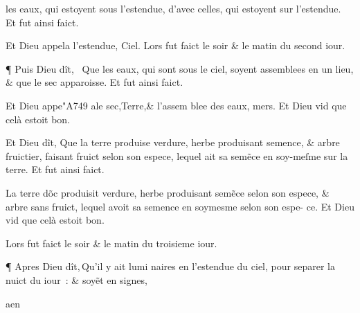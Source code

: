 \documentclass[twocolumn,paper=a4,pagesize=pdftex,12pt,headinclude=on]{scrbook}
\newcounter{verse}
\newcommand{\bverse}{%
  \addtocounter{verse}{1}
  \theverse\quad
}
\let\lb\linebreak
\begin{document}
 \noindent les eaux, qui estoyent sous
 l'estendue, d'avec celles, qui estoyent sur l'esten\-due. Et fut ainsi faict.

\bverse Et Dieu appela l'estendue, Ciel.
 Lors fut faict le soir \& le matin du second iour.

\bverse ¶ Puis Dieu dît, 
 \footnotemarkverse{}~\footnotemarkmain{}Que les eaux,
 qui sont sous le ciel,
 soyent assemblees en un lieu, \& que le sec apparoisse. Et fut ainsi faict.

\bverse Et Dieu appe\char"A749 ale sec,Terre,\& l'assem \lb
 blee des eaux, mers.
 Et Dieu vid que celà estoit bon.

\bverse Et Dieu dît, Que la terre produise verdure, herbe produisant semence,
 \& arbre fruictier, faisant fruict selon son espece, lequel ait sa sem\~ece
 en soy-meſ\-me sur la terre. Et fut ainsi faict.

\bverse La terre d\~oc produisit verdure, her\-be produisant sem\~ece
 selon son espece, \& arbre sans fruict, lequel avoit sa \lb
  semence en soymesme selon son espe- \lb
 ce. Et Dieu vid que celà estoit bon.

\bverse Lors fut faict le soir \& le matin du troisieme iour.

\addtocounter{footnotemain}{1}

\bverse ¶ Apres Dieu dît,\footnotemarkverse{}\,\footnotemarkmain{}Qu'il y ait lumi \lb
 naires en l'estendue du ciel, pour
 sepa\-rer la nuict du iour~: \& soy\~et en
 \footnotemarkmain{}signes,

\vspace{-2cm}
\begin{flushright}
a\quad en
\end{flushright}
\end{document}
